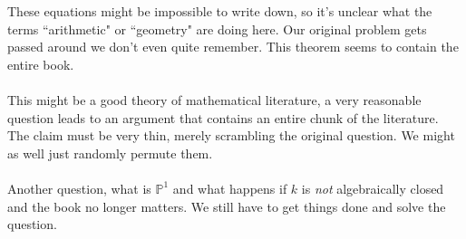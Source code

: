 \documentclass[12pt]{article}
\begin{document}
These equations might be impossible to write down, so it's unclear what the terms ``arithmetic" or ``geometry" are doing here.  Our original problem gets passed around we don't even quite remember.  This theorem seems to contain the entire book.  \\ \\
This might be a good theory of mathematical literature, a very reasonable question leads to an argument that contains an entire chunk of the literature.  The claim must be very thin, merely scrambling the original question.  We might as well just randomly permute them. \\ \\
Another question, what is $\mathbb{P}^1$ and what happens if $k$ is \textit{not} algebraically closed and the book no longer matters.  We still have to get things done and solve the question. 
\end{document}
